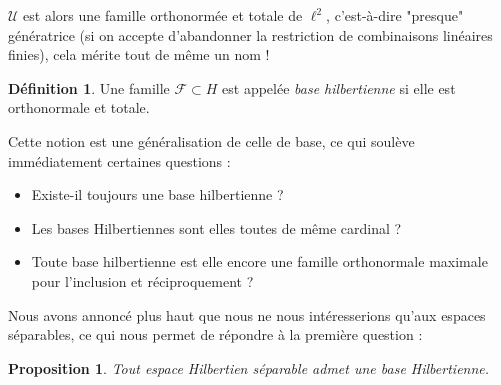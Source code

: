 \documentclass[]{article}
\newtheorem{myproposition}{Proposition}
\theoremstyle{remark}
\theoremstyle{definition}
\newtheorem{mydef}{Définition}
\begin{document}
	$\mathcal{U}$ est alors une famille orthonormée et totale de $\ell^2$, c'est-à-dire "presque" génératrice (si on accepte d'abandonner la restriction de combinaisons linéaires finies), cela mérite tout de même un nom !
	
	\begin{mydef}
		Une famille $\mathcal{F} \subset H$ est appelée \textit{base hilbertienne} si elle est orthonormale et totale.
	\end{mydef}
	
	Cette notion est une généralisation de celle de base, ce qui soulève immédiatement certaines questions :
	
	\begin{itemize}
		\item Existe-il toujours une base hilbertienne ?
		\item Les bases Hilbertiennes sont elles toutes de même cardinal ?
		\item Toute base hilbertienne est elle encore une famille orthonormale maximale pour l'inclusion et réciproquement ?
	\end{itemize}
	
	Nous avons annoncé plus haut que nous ne nous intéresserions qu'aux espaces séparables, ce qui nous permet de répondre à la première question :
	
	\begin{myproposition}
		Tout espace Hilbertien séparable admet une base Hilbertienne.
	\end{myproposition}
	
\end{document}
